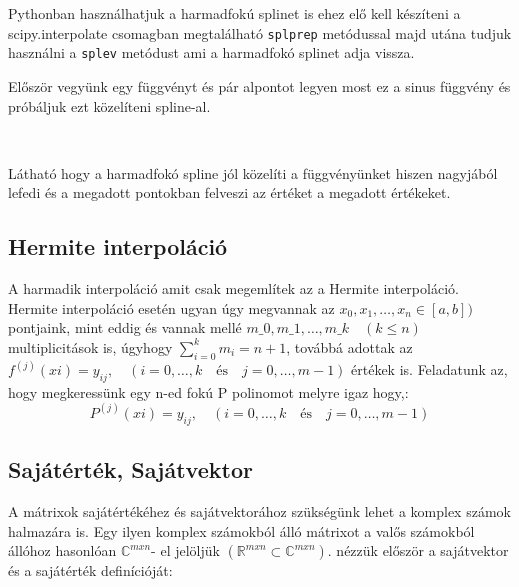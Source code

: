     Pythonban használhatjuk a harmadfokú splinet is ehez elő kell készíteni
a scipy.interpolate csomagban megtalálható \texttt{splprep} metódussal
majd utána tudjuk használni a \texttt{splev} metódust ami a harmadfokó
splinet adja vissza.

    Először vegyünk egy függvényt és pár alpontot legyen most ez a sinus
függvény és próbáljuk ezt közelíteni spline-al.

\begin{python}

\end{python}

    \begin{center}
    \end{center}
    { \hspace*{\fill} \\}
    
    Látható hogy a harmadfokó spline jól közelíti a függvényünket hiszen
nagyjából lefedi és a megadott pontokban felveszi az értéket a megadott
értékeket.

    \subsection{Hermite interpoláció}\label{hermite-interpoluxe1ciuxf3}

    A harmadik interpoláció amit csak megemlítek az a Hermite interpoláció.
Hermite interpoláció esetén ugyan úgy megvannak az
\(x_0, x_1, \dots, x_n \in [a,b])\) pontjaink, mint eddig és vannak
mellé $m\_0, m\_1, \dots, m\_k \quad (k\leq n)$ multiplicitások is,
úgyhogy $\sum_{i=0}^k m_i=n+1$, továbbá adottak az
\(f^{(j)}(xi)=y_{ij}, \quad (i=0,\dots,k \quad\textrm{és}\quad j=0,\dots,m-1)\)
értékek is. Feladatunk az, hogy megkeressünk egy n-ed fokú P polinomot
melyre igaz hogy,: \[
P^{(j)}(xi)=y_{ij}, \quad (i=0,\dots,k \quad\textrm{és}\quad j=0,\dots,m-1)
\]

\subsection{Sajátérték,
Sajátvektor}\label{sajuxe1tuxe9rtuxe9k-sajuxe1tvektor}

    A mátrixok sajátértékéhez és sajátvektorához szükségünk lehet a komplex
számok halmazára is. Egy ilyen komplex számokból álló mátrixot a valős
számokból állóhoz hasonlóan \(\mathbb{C}^{mxn}\)- el jelöljük
\((\mathbb{R}^{mxn} \subset \mathbb{C}^{mxn})\). nézzük először a
sajátvektor és a sajátérték definícióját:

